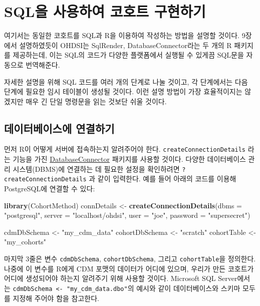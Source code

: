 \documentclass[10.5pt]{book}
\newenvironment{Shaded}{\begin{snugshade}}{\end{snugshade}}
\newcommand{\KeywordTok}[1]{\textcolor[rgb]{0.13,0.29,0.53}{\textbf{#1}}}
\newcommand{\DataTypeTok}[1]{\textcolor[rgb]{0.13,0.29,0.53}{#1}}
\newcommand{\StringTok}[1]{\textcolor[rgb]{0.31,0.60,0.02}{#1}}
\newcommand{\NormalTok}[1]{#1}
\theoremstyle{definition}
\theoremstyle{definition}
\theoremstyle{definition}
\theoremstyle{remark}
\begin{document}
\section{SQL을 사용하여 코호트 구현하기}\label{sql---}

여기서는 동일한 코호트를 SQL과 R을 이용하여 작성하는 방법을 설명할
것이다. 9장에서 설명하였듯이 OHDSI는 SqlRender, DatabaseConnector라는 두
개의 R 패키지를 제공하는데, 이는 SQL의 코드가 다양한 플랫폼에서 실행될
수 있게끔 SQL문을 자동으로 번역해준다.

자세한 설명을 위해 SQL 코드를 여러 개의 단계로 나눌 것이고, 각
단계에서는 다음 단계에 필요한 임시 테이블이 생성될 것이다. 이런 설명
방법이 가장 효율적이지는 않겠지만 매우 긴 단일 명령문을 읽는 것보단 쉬울
것이다.

\subsection{데이터베이스에 연결하기}\label{-}

먼저 R이 어떻게 서버에 접속하는지 알려주어야 한다.
\texttt{createConnectionDetails} 라는 기능을 가진
\href{https://ohdsi.github.io/DatabaseConnector/}{DatabaseConnector}
패키지를 사용할 것이다. 다양한 데이터베이스 관리 시스템(DBMS)에 연결하는
데 필요한 설정을 확인하려면 \texttt{?createConnectionDetails} 과 같이
입력한다. 예를 들어 아래의 코드를 이용해 PostgreSQL에 연결할 수 있다:

\begin{Shaded}
\begin{Highlighting}[]
\KeywordTok{library}\NormalTok{(CohortMethod)}
\NormalTok{connDetails <-}\StringTok{ }\KeywordTok{createConnectionDetails}\NormalTok{(}\DataTypeTok{dbms =} \StringTok{"postgresql"}\NormalTok{,}
                                       \DataTypeTok{server =} \StringTok{"localhost/ohdsi"}\NormalTok{,}
                                       \DataTypeTok{user =} \StringTok{"joe"}\NormalTok{,}
                                       \DataTypeTok{password =} \StringTok{"supersecret"}\NormalTok{)}

\NormalTok{cdmDbSchema <-}\StringTok{ "my_cdm_data"}
\NormalTok{cohortDbSchema <-}\StringTok{ "scratch"}
\NormalTok{cohortTable <-}\StringTok{ "my_cohorts"}
\end{Highlighting}
\end{Shaded}

마지막 3줄은 변수 \texttt{cdmDbSchema}, \texttt{cohortDbSchema}, 그리고
\texttt{cohortTable}을 정의한다. 나중에 이 변수를 R에게 CDM 포맷의
데이터가 어디에 있으며, 우리가 만든 코호트가 어디에 생성되어야 하는지
알려주기 위해 사용할 것이다. Microsoft SQL Server에서는
\texttt{cdmDbSchema\ \textless{}-\ "my\_cdm\_data.dbo"}의 예시와 같이
데이터베이스와 스키마 모두를 지정해 주어야 함을 참고한다.
\end{document}
